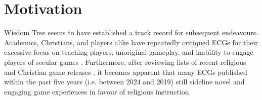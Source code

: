 


\section{Motivation} %

Wisdom Tree seems to have established a track record for subsequent endeavours. Academics, Christians, and players alike have repeatedly critiqued \acp{ECG} for their excessive focus on teaching players, unoriginal gameplay, and inability to engage players of secular games \parencite{bogost_persuasive_2007, schut_making_2013, moon_channel_why_2023, innocentbystander_why_2009}. Furthermore, after reviewing lists of recent religious and Christian game releases \parencite{gonzalez_religious_2022, noauthor_list_2024}, it becomes apparent that many \acp{ECG} published within the past five years (i.e. between 2024 and 2019) still sideline novel and engaging game experiences in favour of religious instruction.%









